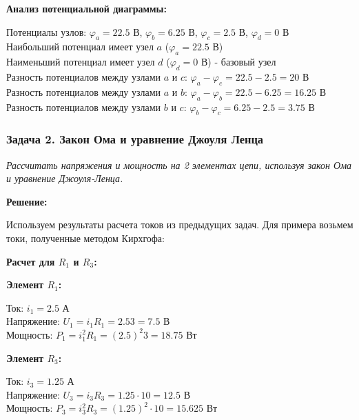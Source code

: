 \textbf{Анализ потенциальной диаграммы:}
\begin{flushleft}
Потенциалы узлов: $\varphi_a = 22.5$ В, $\varphi_b = 6.25$ В, $\varphi_c = 2.5$ В, $\varphi_d = 0$ В \\
Наибольший потенциал имеет узел $a$ ($\varphi_a = 22.5$ В) \\
Наименьший потенциал имеет узел $d$ ($\varphi_d = 0$ В) - базовый узел \\
Разность потенциалов между узлами $a$ и $c$: $\varphi_a - \varphi_c = 22.5 - 2.5 = 20$ В \\
Разность потенциалов между узлами $a$ и $b$: $\varphi_a - \varphi_b = 22.5 - 6.25 = 16.25$ В \\
Разность потенциалов между узлами $b$ и $c$: $\varphi_b - \varphi_c = 6.25 - 2.5 = 3.75$ В
\end{flushleft}


\subsubsection{Задача 2. Закон Ома и уравнение Джоуля Ленца}
\textit{Рассчитать напряжения и мощность на 2 элементах цепи, используя закон Ома и уравнение Джоуля-Ленца.}

\textbf{Решение:}

Используем результаты расчета токов из предыдущих задач. Для примера возьмем токи, полученные методом Кирхгофа:

\textbf{Расчет для $R_1$ и $R_3$:}

\textbf{Элемент $R_1$:}
\begin{flushleft}
Ток: $i_1 = 2.5$ А \\
Напряжение: $U_1 = i_1R_1 = 2.5 3 = 7.5$ В \\
Мощность: $P_1 = i_1^2R_1 = (2.5)^2  3 = 18.75$ Вт
\end{flushleft}

\textbf{Элемент $R_3$:}
\begin{flushleft}
Ток: $i_3 = 1.25$ А \\
Напряжение: $U_3 = i_3R_3 = 1.25 \cdot 10 = 12.5$ В \\
Мощность: $P_3 = i_3^2R_3 = (1.25)^2 \cdot 10 = 15.625$ Вт
\end{flushleft}

